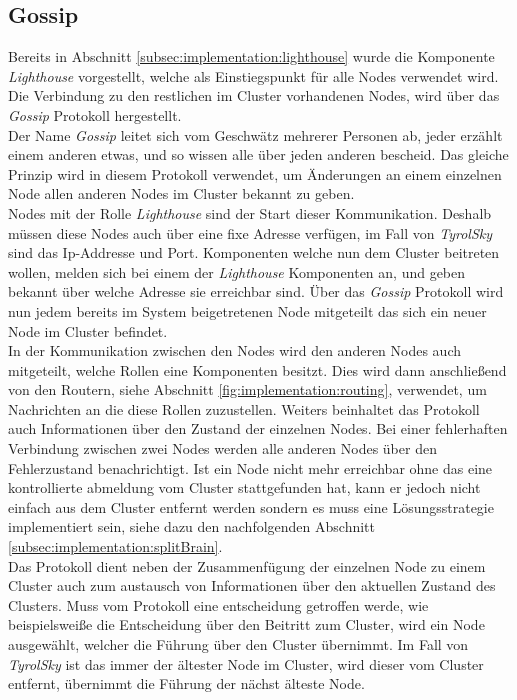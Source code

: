 \subsection{Gossip}
\label{subsec:implementation:gossip}
Bereits in Abschnitt \ref{subsec:implementation:lighthouse} wurde die Komponente \textit{Lighthouse} vorgestellt, welche als Einstiegspunkt für alle Nodes verwendet wird. Die Verbindung zu den restlichen im Cluster vorhandenen Nodes, wird über das \textit{Gossip} Protokoll hergestellt. \\
Der Name \textit{Gossip} leitet sich vom Geschwätz mehrerer Personen ab, jeder erzählt einem anderen etwas, und so wissen alle über jeden anderen  bescheid. Das gleiche Prinzip wird in diesem Protokoll verwendet, um Änderungen an einem einzelnen Node allen anderen Nodes im Cluster bekannt zu geben. \\
Nodes mit der Rolle \textit{Lighthouse} sind der Start dieser Kommunikation. Deshalb müssen diese Nodes auch über eine fixe Adresse verfügen, im Fall von \textit{TyrolSky} sind das Ip-Addresse und Port. Komponenten welche nun dem Cluster beitreten wollen, melden sich bei einem der \textit{Lighthouse} Komponenten an, und geben bekannt über welche Adresse sie erreichbar sind. Über das \textit{Gossip} Protokoll wird nun jedem bereits im System beigetretenen Node mitgeteilt das sich ein neuer Node im Cluster befindet. \\
In der Kommunikation zwischen den Nodes wird den anderen Nodes auch mitgeteilt, welche Rollen eine Komponenten besitzt. Dies wird dann anschließend von den Routern, siehe Abschnitt \ref{fig:implementation:routing}, verwendet, um Nachrichten an die diese Rollen zuzustellen. Weiters beinhaltet das Protokoll auch Informationen über den Zustand der einzelnen Nodes. Bei einer fehlerhaften Verbindung zwischen zwei Nodes werden alle anderen Nodes über den Fehlerzustand benachrichtigt. Ist ein Node nicht mehr erreichbar ohne das eine kontrollierte abmeldung vom Cluster stattgefunden hat, kann er jedoch nicht einfach aus dem Cluster entfernt werden sondern es muss eine Lösungsstrategie implementiert sein, siehe dazu den nachfolgenden Abschnitt \ref{subsec:implementation:splitBrain}. \\ 
Das Protokoll dient neben der Zusammenfügung der einzelnen Node zu einem Cluster auch zum austausch von Informationen über den aktuellen Zustand des Clusters. Muss vom Protokoll eine entscheidung getroffen werde, wie beispielsweiße die Entscheidung über den Beitritt zum Cluster, wird ein Node ausgewählt, welcher die Führung über den Cluster übernimmt. Im Fall von \textit{TyrolSky} ist das immer der ältester Node im Cluster, wird dieser vom Cluster entfernt, übernimmt die Führung der nächst älteste Node.  

